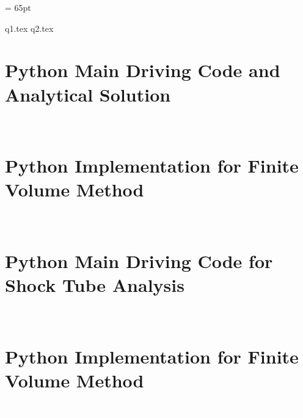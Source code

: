 \documentclass[12pt]{extarticle}
\begin{document}
      

        \thispagestyle{firstpage}
        \headsep = 65pt %

        {q1.tex}
        {q2.tex}

        \pagebreak
        \section*{Python Main Driving Code and Analytical Solution}
        
        \textcolor{white}{a}
        
        \pagebreak
        \section*{Python Implementation for Finite Volume Method}
        
        \textcolor{white}{a}

               
        \pagebreak
        \section*{Python Main Driving Code for Shock Tube Analysis}
        
        \textcolor{white}{a}

       \pagebreak
       \section*{Python Implementation for Finite Volume Method}
       
        \textcolor{white}{a}
\end{document}

